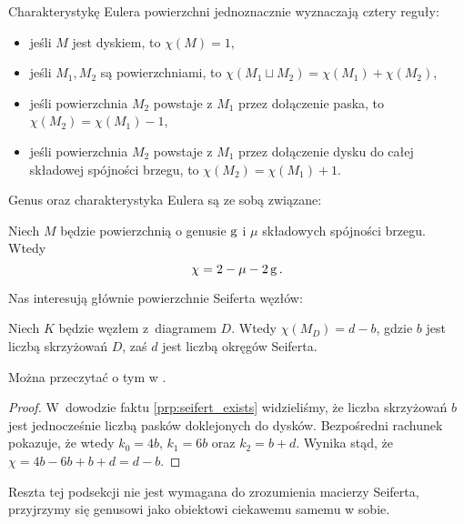 \begin{proposition}
    Charakterystykę Eulera powierzchni jednoznacznie wyznaczają cztery reguły:
    \begin{itemize}
        \item jeśli $M$ jest dyskiem, to $\chi(M) = 1$,
        \item jeśli $M_1, M_2$ są powierzchniami, to $\chi(M_1 \sqcup M_2) = \chi(M_1) + \chi(M_2)$,
        \item jeśli powierzchnia $M_2$ powstaje z $M_1$ przez dołączenie paska, to $\chi(M_2) = \chi(M_1) - 1$,
        \item jeśli powierzchnia $M_2$ powstaje z $M_1$ przez dołączenie dysku do całej składowej spójności brzegu, to $\chi(M_2) = \chi(M_1) + 1$.
    \end{itemize}
\end{proposition}

Genus oraz charakterystyka Eulera są ze sobą związane:

\begin{proposition}
    Niech $M$ będzie powierzchnią o genusie $\operatorname{g}$ i $\mu$ składowych spójności brzegu.
    Wtedy
    \begin{equation}
        \chi = 2 - \mu - 2\operatorname{g}.
    \end{equation}
\end{proposition}

Nas interesują głównie powierzchnie Seiferta węzłów:

\begin{proposition}
    \label{prp:seifert_euler_characteristics}
    Niech $K$ będzie węzłem z~diagramem $D$.
    Wtedy $\chi(M_D) = d - b$, gdzie $b$ jest liczbą skrzyżowań $D$, zaś $d$ jest liczbą okręgów Seiferta.
\end{proposition}

Można przeczytać o tym w \cite[s. 82]{murasugi96}.

\begin{proof}
    W~dowodzie faktu \ref{prp:seifert_exists} widzieliśmy, że liczba skrzyżowań $b$ jest jednocześnie liczbą pasków doklejonych do dysków.
    Bezpośredni rachunek pokazuje, że wtedy $k_0 = 4b$, $k_1 = 6b$ oraz $k_2 = b+d$.
    Wynika stąd, że $\chi = 4b - 6b + b + d = d - b$.
\end{proof}

Reszta tej podsekcji nie jest wymagana do zrozumienia macierzy Seiferta, przyjrzymy się genusowi jako obiektowi ciekawemu samemu w sobie.

